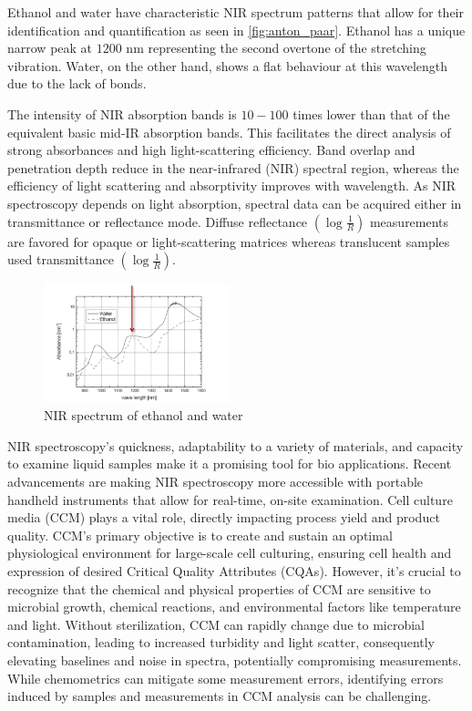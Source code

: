 \documentclass[12pt]{report}
\renewcommand{\cite}{\supercite}
\begin{document}
Ethanol and water have characteristic NIR spectrum patterns that allow for their identification and quantification as seen in \autoref{fig:anton_paar}. Ethanol has a unique narrow peak at $1200$ nm representing the second overtone of the  stretching vibration.\cite{InfraredSpectroscopyNIR} Water, on the other hand, shows a flat behaviour at this wavelength due to the lack of  bonds. 

The intensity of NIR absorption bands is $10-100$ times lower than that of the equivalent basic mid-IR absorption bands. This facilitates the direct analysis of strong absorbances and high light-scattering efficiency. Band overlap and penetration depth reduce in the near-infrared (NIR) spectral region, whereas the efficiency of light scattering and absorptivity improves with wavelength. As NIR spectroscopy depends on light absorption, spectral data can be acquired either in transmittance or reflectance mode. Diffuse reflectance $(\log \frac{1}{R} )$ measurements are favored for opaque or light-scattering matrices whereas translucent samples used transmittance $(\log \frac{1}{R})$.

\begin{figure}
    \centering
    \includegraphics[width=0.48\textwidth]{Images/anton_paar.png}
    \caption{NIR spectrum of ethanol and water \cite{InfraredSpectroscopyNIR}}
    \label{fig:anton_paar}
\end{figure}

NIR spectroscopy's quickness, adaptability to a variety of materials, and capacity to examine liquid samples make it a promising tool for bio applications.\cite{NearInfraredSpectroscopyBioApplicationsbec2020} Recent advancements are making NIR spectroscopy more accessible with portable handheld instruments that allow for real-time, on-site examination. 
Cell culture media (CCM) plays a vital role, directly impacting process yield and product quality.\cite{CellCultureMediaryder2018} CCM's primary objective is to create and sustain an optimal physiological environment for large-scale cell culturing, ensuring cell health and expression of desired Critical Quality Attributes (CQAs). However, it's crucial to recognize that the chemical and physical properties of CCM are sensitive to microbial growth, chemical reactions, and environmental factors like temperature and light. Without sterilization, CCM can rapidly change due to microbial contamination, leading to increased turbidity and light scatter, consequently elevating baselines and noise in spectra, potentially compromising measurements. While chemometrics can mitigate some measurement errors, identifying errors induced by samples and measurements in CCM analysis can be challenging.
\end{document}

